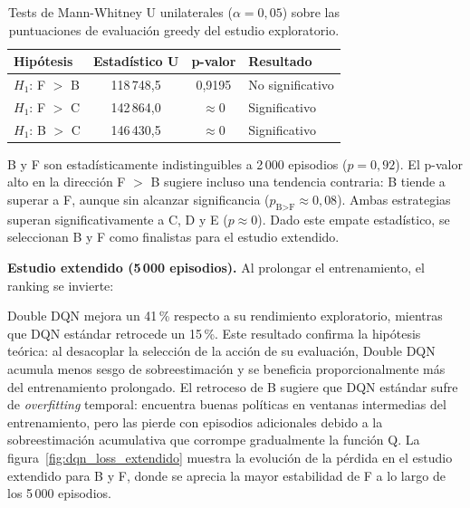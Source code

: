 \begin{table}[htbp]
\centering
\begin{tabular}{l c c l}
\hline
\textbf{Hipótesis} & \textbf{Estadístico U} & \textbf{p-valor} & \textbf{Resultado} \\
\hline
$H_1$: F $>$ B & 118\,748{,}5 & 0{,}9195 & No significativo \\
$H_1$: F $>$ C & 142\,864{,}0 & $\approx 0$    & Significativo     \\
$H_1$: B $>$ C & 146\,430{,}5 & $\approx 0$    & Significativo     \\
\hline
\end{tabular}
\caption{Tests de Mann-Whitney U unilaterales ($\alpha = 0{,}05$) sobre las puntuaciones
de evaluación greedy del estudio exploratorio.}
\label{tab:mannwhitney}
\end{table}

B y F son estadísticamente indistinguibles a 2\,000 episodios ($p = 0{,}92$). El p-valor alto en la dirección F $>$ B sugiere incluso una tendencia contraria: B tiende a superar a F, aunque sin alcanzar significancia ($p_{\text{B}>\text{F}} \approx 0{,}08$). Ambas estrategias superan significativamente a C, D y E ($p \approx 0$). Dado este empate estadístico, se seleccionan B y F como finalistas para el estudio extendido.

\textbf{Estudio extendido (5\,000 episodios).}
Al prolongar el entrenamiento, el ranking se invierte:
\begin{table}[h]
\centering
\caption{Rendimiento determinista final en el estudio extendido (5\,000 episodios),
comparado con el exploratorio.}
\label{tab:dqn_extendido}
\end{table}

Double DQN mejora un 41\,\% respecto a su rendimiento exploratorio, mientras que DQN estándar retrocede un 15\,\%. Este resultado confirma la hipótesis teórica: al desacoplar la selección de la acción de su evaluación, Double DQN acumula menos sesgo de sobreestimación y se beneficia proporcionalmente más del entrenamiento prolongado. El retroceso de B sugiere que DQN estándar sufre de \textit{overfitting} temporal: encuentra buenas políticas en ventanas intermedias del entrenamiento, pero las pierde con episodios adicionales debido a la sobreestimación acumulativa que corrompe gradualmente la función Q. La figura~\ref{fig:dqn_loss_extendido} muestra la evolución de la pérdida en el estudio extendido para B y F, donde se aprecia la mayor estabilidad de F a lo largo de los 5\,000 episodios.

